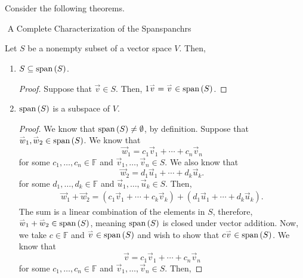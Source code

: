         \pagebreak
        \vphantom
        \\
        \\
        Consider the following theorems.
        \begin{theorem}{\Stop\,\,A Complete Characterization of the Span}{spanchrs}
            
            Let \(S\) be a nonempty subset of a vector space \(V\). Then,
            \begin{enumerate}
                \item \(S\subseteq \text{span\,}(S)\).
                \begin{proof}
                    Suppose that \(\vec{v}\in S\). Then, \(1\overset{_{\rightharpoonup}}{v}=\overset{_{\rightharpoonup}}{v}\in\text{span\,}(S)\).
                \end{proof}
                \item \(\text{span\,}(S)\) is a subspace of \(V\).
                \begin{proof}
                    We know that \(\text{span\,}(S)\neq\emptyset\), by definition. Suppose that \(\overset{_{\rightharpoonup}}{w}_1,\overset{_{\rightharpoonup}}{w}_2\in \text{span\,}(S)\). We know that 
                    \begin{equation*}
                        \vec{w}_1=c_1\vec{v}_1+\cdots+c_n\vec{v}_n
                    \end{equation*} 
                    for some \(c_1,\ldots,c_n\in\mathbb{F}\) and \(\vec{v}_1,\ldots,\vec{v}_n\in S\). We also know that
                    \begin{equation*}
                        \vec{w}_2=d_1\vec{u}_1+\cdots+d_k\vec{u}_k.
                    \end{equation*}
                    for some \(d_1,\ldots,d_k\in\mathbb{F}\) and \(\vec{u}_1,\ldots,\vec{u}_k\in S\). Then,
                    \begin{align*}
                        \vec{w}_1+\vec{w}_2=(c_1\vec{v}_1+\cdots+c_k\vec{v}_k)+(d_1\vec{u}_1+\cdots+d_k\vec{u}_k).
                    \end{align*}
                    The sum is a linear combination of the elements in \(S\), therefore, \(\overset{_{\rightharpoonup}}{w}_1+\overset{_{\rightharpoonup}}{w}_2\in\text{span\,}(S)\), meaning \(\text{span\,}(S)\) is closed under vector addition. Now, we take \(c\in\mathbb{F}\) and \(\overset{_{\rightharpoonup}}{v}\in\text{span\,}(S)\) and wish to show that \(c\overset{_{\rightharpoonup}}{v}\in\text{span\,}(S)\). We know that
                    \begin{equation*}
                        \vec{v}=c_1\vec{v}_1+\cdots+c_n\vec{v}_n
                    \end{equation*}
                    for some \(c_1,\ldots,c_n\in\mathbb{F}\) and \(\vec{v}_1,\ldots,\vec{v}_n\in S\). Then,

\end{proof}
\end{enumerate}
\end{theorem}
